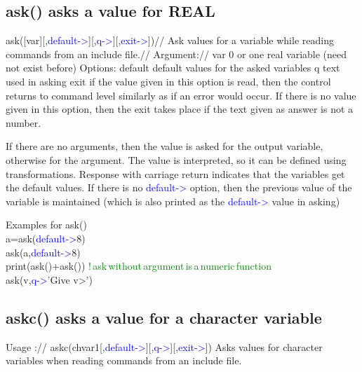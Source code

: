 \subsection{\textcolor{VioletRed}{ask}() asks a value for REAL}
\label{ask}
\textcolor{VioletRed}{ask}([var][,\textcolor{blue}{default->}][,\textcolor{blue}{q->}][,\textcolor{blue}{exit->}])//
Ask values for a variable while reading commands from an include file.//
Argument://
var 0 or one real variable (need not exist before)
Options:
default default values for the asked variables
q text used in asking
exit if the value given in this option is read, then the control returns to command level
similarly as if an error would occur. If there is no value given in this option, then
the exit takes place if the text given as answer is not a number.
\begin{note}
If there are no arguments, then the value is asked for the output variable, otherwise for
the argument. The value is interpreted, so it can be defined using transformations.
Response with carriage return indicates that the variables get the default values. If there is no
\textcolor{blue}{default->} option, then the previous value of the variable is maintained (which is also printed
as the \textcolor{blue}{default->} value in asking)
\end{note}

\begin{example}[askex]Examples for \textcolor{VioletRed}{ask}()\\
\label{askex}
a=\textcolor{VioletRed}{ask}(\textcolor{blue}{default->}8)\\
\textcolor{VioletRed}{ask}(a,\textcolor{blue}{default->}8)\\
\textcolor{VioletRed}{print}(\textcolor{VioletRed}{ask}()+\textcolor{VioletRed}{ask}()) \textcolor{green}{!\,ask\,without\,argument\,is\,a\,numeric\,function}\\
\textcolor{VioletRed}{ask}(v,\textcolor{blue}{q->}'Give v>')
\end{example}
\subsection{\textcolor{VioletRed}{askc}() asks a value for a character variable}
\label{askc}
Usage ://
\textcolor{VioletRed}{askc}(chvar1[,\textcolor{blue}{default->}][,\textcolor{blue}{q->}][,\textcolor{blue}{exit->}])
Asks values for character variables when reading commands from an include file.

